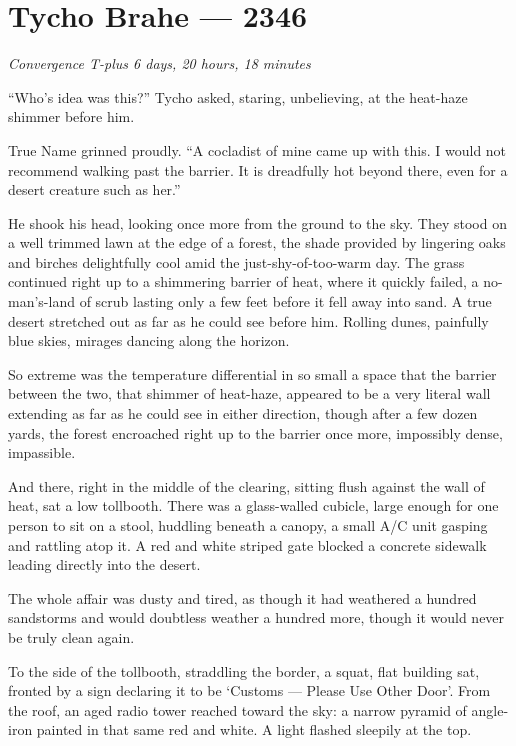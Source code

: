 \hypertarget{tycho-brahe-2346}{%
\chapter{Tycho Brahe — 2346}\label{tycho-brahe-2346}}

\begin{center}
\emph{Convergence T-plus 6 days, 20 hours, 18 minutes}
\end{center}

\noindent ``Who's idea was this?'' Tycho asked, staring, unbelieving, at the heat-haze shimmer before him.

True Name grinned proudly. ``A cocladist of mine came up with this. I would not recommend walking past the barrier. It is dreadfully hot beyond there, even for a desert creature such as her.''

He shook his head, looking once more from the ground to the sky. They stood on a well trimmed lawn at the edge of a forest, the shade provided by lingering oaks and birches delightfully cool amid the just-shy-of-too-warm day. The grass continued right up to a shimmering barrier of heat, where it quickly failed, a no-man's-land of scrub lasting only a few feet before it fell away into sand. A true desert stretched out as far as he could see before him. Rolling dunes, painfully blue skies, mirages dancing along the horizon.

So extreme was the temperature differential in so small a space that the barrier between the two, that shimmer of heat-haze, appeared to be a very literal wall extending as far as he could see in either direction, though after a few dozen yards, the forest encroached right up to the barrier once more, impossibly dense, impassible.

And there, right in the middle of the clearing, sitting flush against the wall of heat, sat a low tollbooth. There was a glass-walled cubicle, large enough for one person to sit on a stool, huddling beneath a canopy, a small A/C unit gasping and rattling atop it. A red and white striped gate blocked a concrete sidewalk leading directly into the desert.

The whole affair was dusty and tired, as though it had weathered a hundred sandstorms and would doubtless weather a hundred more, though it would never be truly clean again.

To the side of the tollbooth, straddling the border, a squat, flat building sat, fronted by a sign declaring it to be `Customs — Please Use Other Door'. From the roof, an aged radio tower reached toward the sky: a narrow pyramid of angle-iron painted in that same red and white. A light flashed sleepily at the top.

